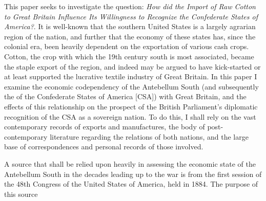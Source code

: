 \documentclass{subfiles}
\begin{document}
This paper seeks to investigate the question: \flq{} \textit{How did the Import of Raw Cotton to Great Britain Influence Its Willingness to Recognize the
Confederate States of America?}\frq{}. It is well-known that the southern United States is a largely agrarian region of the nation, and further that the 
economy of these states has, since the colonial era, been heavily dependent on the exportation of various \flq{}cash crops\frq{}. Cotton, the crop with which 
the 19th century south is most associated, became the staple export of the region, and indeed may be argued to have kick-started or at least supported the 
lucrative textile industry of Great Britain. In this paper I examine the economic codependency of the Antebellum South (and subsequently the of the 
Confederate States of America [CSA]) with Great Britain, and the effects of this relationship on the prospect of the British Parliament's diplomatic 
recognition of the CSA as a sovereign nation. To do this, I shall rely on the vast contemporary records of exports and manufactures, the body of post-
contemporary literature regarding the relations of both nations, and the large base of correspondences and personal records of those involved.

A source that shall be relied upon heavily in assessing the economic state of the Antebellum South in the decades leading up to the war is 
 from the first session of the 48th Congress of the United States of America, held in 1884. The purpose of
this source 
\end{document}

